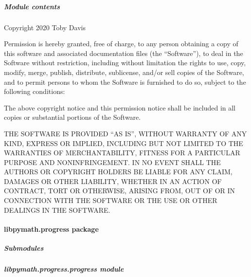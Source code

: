 \documentclass[letterpaper,10pt,english]{sphinxmanual}
\begin{document}
\subparagraph{Module contents}
\label{\detokenize{libpymath.matrix:module-libpymath.matrix}}\label{\detokenize{libpymath.matrix:module-contents}}
Copyright 2020 Toby Davis

Permission is hereby granted, free of charge, to any person obtaining a copy of
this software and associated documentation files (the “Software”), to deal in
the Software without restriction, including without limitation the rights to
use, copy, modify, merge, publish, distribute, sublicense, and/or sell copies
of the Software, and to permit persons to whom the Software is furnished to do
so, subject to the following conditions:

The above copyright notice and this permission notice shall be included in all
copies or substantial portions of the Software.

THE SOFTWARE IS PROVIDED “AS IS”, WITHOUT WARRANTY OF ANY KIND, EXPRESS OR
IMPLIED, INCLUDING BUT NOT LIMITED TO THE WARRANTIES OF MERCHANTABILITY, FITNESS
FOR A PARTICULAR PURPOSE AND NONINFRINGEMENT. IN NO EVENT SHALL THE AUTHORS OR
COPYRIGHT HOLDERS BE LIABLE FOR ANY CLAIM, DAMAGES OR OTHER LIABILITY, WHETHER
IN AN ACTION OF CONTRACT, TORT OR OTHERWISE, ARISING FROM, OUT OF OR IN
CONNECTION WITH THE SOFTWARE OR THE USE OR OTHER DEALINGS IN THE SOFTWARE.


\paragraph{libpymath.progress package}
\label{\detokenize{libpymath.progress:libpymath-progress-package}}\label{\detokenize{libpymath.progress::doc}}

\subparagraph{Submodules}
\label{\detokenize{libpymath.progress:submodules}}

\subparagraph{libpymath.progress.progress module}
\label{\detokenize{libpymath.progress:module-libpymath.progress.progress}}\label{\detokenize{libpymath.progress:libpymath-progress-progress-module}}
\end{document}
